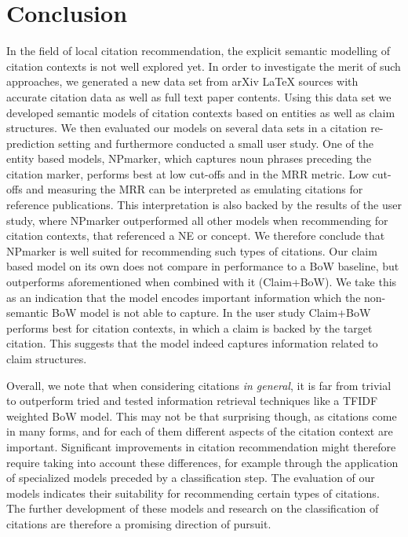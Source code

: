 \chapter{Conclusion}\label{chap:conclusion}
In the field of local citation recommendation, the explicit semantic modelling of citation contexts is not well explored yet. In order to investigate the merit of such approaches, we generated a new data set from arXiv \LaTeX{} sources with accurate citation data as well as full text paper contents. Using this data set we developed semantic models of citation contexts based on entities as well as claim structures. We then evaluated our models on several data sets in a citation re-prediction setting and furthermore conducted a small user study. One of the entity based models, NPmarker, which captures noun phrases preceding the citation marker, performs best at low cut-offs and in the MRR metric. Low cut-offs and measuring the MRR can be interpreted as emulating citations for reference publications. This interpretation is also backed by the results of the user study, where NPmarker outperformed all other models when recommending for citation contexts, that referenced a NE or concept. We therefore conclude that NPmarker is well suited for recommending such types of citations. Our claim based model on its own does not compare in performance to a BoW baseline, but outperforms aforementioned when combined with it (Claim+BoW). We take this as an indication that the model encodes important information which the non-semantic BoW model is not able to capture. In the user study Claim+BoW performs best for citation contexts, in which a claim is backed by the target citation. This suggests that the model indeed captures information related to claim structures.

Overall, we note that when considering citations \emph{in general}, it is far from trivial to outperform tried and tested information retrieval techniques like a TFIDF weighted BoW model. This may not be that surprising though, as citations come in many forms, and for each of them different aspects of the citation context are important. Significant improvements in citation recommendation might therefore require taking into account these differences, for example through the application of specialized models preceded by a classification step. The evaluation of our models indicates their suitability for recommending certain types of citations. The further development of these models and research on the classification of citations are therefore a promising direction of pursuit.
